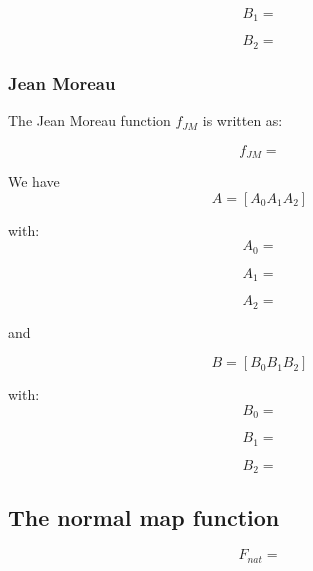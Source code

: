 \documentclass[a4paper]{article}
\begin{document}
\begin{equation}
  B_1 = 
\end{equation}

\begin{equation}
  B_2 = 
\end{equation}

\subsubsection{Jean Moreau}
The Jean Moreau function $f_{JM}$ is written as:

\begin{equation}
  f_{JM} = 
\end{equation}

We have 
\begin{equation}
  A = \left[ A_0 A_1 A_2 \right]
\end{equation}

with:
\begin{equation}
  A_0 = 
\end{equation}

\begin{equation}
  A_1 = 
\end{equation}

\begin{equation}
  A_2 = 
\end{equation}

and

\begin{equation}
  B = \left[ B_0 B_1 B_2 \right]
\end{equation}

with:
\begin{equation}
  B_0 = 
\end{equation}

\begin{equation}
  B_1 = 
\end{equation}

\begin{equation}
  B_2 = 
\end{equation}

\subsection{The normal map function}

\begin{equation}
  F_{nat} = 
\end{equation}
\end{document}
